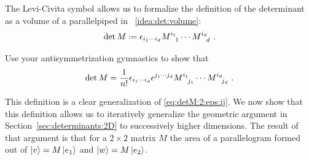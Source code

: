 \documentclass[12pt, oneside]{report}    %
\begin{document}
The Levi-Civita symbol allows us to formalize the definition of the determinant as a volume of a parallelpiped in \bigidearef{}~\ref{idea:det:volume}:
\begin{align}
    \det M \defeq \epsilon_{i_1 \cdots i_d} M\aij{i_1}{1}\cdots M\aij{i_d}{d} \ .
    \label{eq:levi:civita:determinant:definition}
\end{align}
\begin{exercise}
Use your antisymmetrization gymnastics to show that
\begin{align}
    \det M = \frac{1}{n!}
    \epsilon_{i_1 \cdots i_d}
    \epsilon^{j_1 \cdots j_d}
    M\aij{i_1}{j_1}\cdots M\aij{i_d}{j_d} \ .
    \label{eq:levi:civita:determinant:definition:totally:antisymmetrized}
\end{align}
\end{exercise}
This definition is a clear generalization of \eqref{eq:detM:2:eps:ij}. We now show that this definition allows us to iteratively generalize the geometric argument in Section~\ref{sec:determinants:2D} to successively higher dimensions. The result of that argument is that for a $2\times 2$ matrix $M$ the area of a parallelogram formed out of $\left|v\right\rangle=M\left|e_1\right\rangle$ and $\left|w\right\rangle=M\left|e_2\right\rangle$. 
\end{document}

